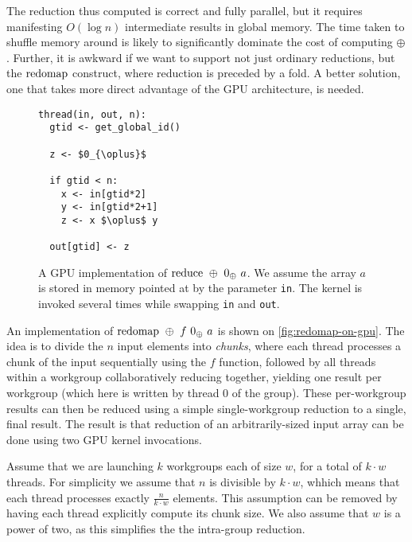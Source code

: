 The reduction thus computed is correct and fully parallel, but it
requires manifesting $O(\log n)$ intermediate results in global
memory.  The time taken to shuffle memory around is likely to
significantly dominate the cost of computing $\oplus$.  Further, it is
awkward if we want to support not just ordinary reductions, but the
$\mathrm{redomap}$ construct, where reduction is preceded by a fold.  A
better solution, one that takes more direct advantage of the GPU
architecture, is needed.

\begin{figure}

\begin{lstlisting}[language={},mathescape]
thread(in, out, n):
  gtid <- get_global_id()

  z <- $0_{\oplus}$

  if gtid < n:
    x <- in[gtid*2]
    y <- in[gtid*2+1]
    z <- x $\oplus$ y

  out[gtid] <- z
\end{lstlisting}

  \caption{A GPU implementation of $\mathrm{reduce}~\oplus~0_{\oplus}~a$.  We
    assume the array $a$ is stored in memory pointed at by the
    parameter \texttt{in}.  The kernel is invoked several times while
    swapping \texttt{in} and \texttt{out}.}
  \label{fig:reduce-on-gpu}
\end{figure}

An implementation of $\mathrm{redomap}~\oplus~f~0_{\oplus}~a$ is shown on
\cref{fig:redomap-on-gpu}.  The idea is to divide the $n$ input
elements into \textit{chunks}, where each thread processes a chunk of
the input sequentially using the $f$ function, followed by all threads
within a workgroup collaboratively reducing together, yielding one
result per workgroup (which here is written by thread 0 of the group).
These per-workgroup results can then be reduced using a simple
single-workgroup reduction to a single, final result.  The result is
that reduction of an arbitrarily-sized input array can be done using
two GPU kernel invocations.

Assume that we are launching $k$ workgroups each of size $w$, for a
total of $k\cdot{}w$ threads.  For simplicity we assume that $n$ is
divisible by $k\cdot{}w$, whhich means that each thread processes
exactly $\frac{n}{k\cdot{}w}$ elements.  This assumption can be
removed by having each thread explicitly compute its chunk size.  We
also assume that $w$ is a power of two, as this simplifies the the
intra-group reduction.


